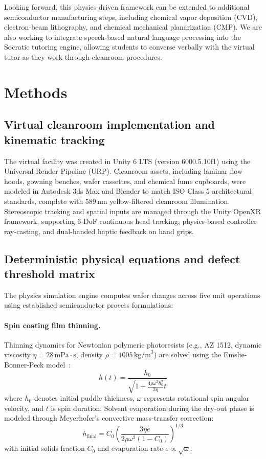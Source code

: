 \documentclass[10pt,a4paper,twocolumn]{article}
\begin{document}
Looking forward, this physics-driven framework can be extended to additional semiconductor manufacturing steps, including chemical vapor deposition (CVD), electron-beam lithography, and chemical mechanical planarization (CMP). We are also working to integrate speech-based natural language processing into the Socratic tutoring engine, allowing students to converse verbally with the virtual tutor as they work through cleanroom procedures.

\section*{Methods}

\subsection*{Virtual cleanroom implementation and kinematic tracking}
The virtual facility was created in Unity 6 LTS (version 6000.5.10f1) using the Universal Render Pipeline (URP). Cleanroom assets, including laminar flow hoods, gowning benches, wafer cassettes, and chemical fume cupboards, were modeled in Autodesk 3ds Max and Blender to match ISO Class 5 architectural standards, complete with $589\,\text{nm}$ yellow-filtered cleanroom illumination. Stereoscopic tracking and spatial inputs are managed through the Unity OpenXR framework, supporting 6-DoF continuous head tracking, physics-based controller ray-casting, and dual-handed haptic feedback on hand grips.

\subsection*{Deterministic physical equations and defect threshold matrix}
The physics simulation engine computes wafer changes across five unit operations using established semiconductor process formulations:

\paragraph{Spin coating film thinning.}
Thinning dynamics for Newtonian polymeric photoresists (e.g., AZ 1512, dynamic viscosity $\eta = 28\,\text{mPa}\cdot\text{s}$, density $\rho = 1005\,\text{kg/m}^3$) are solved using the Emslie-Bonner-Peck model~\cite{emslie1958flow}:
\begin{equation}
h(t) = \frac{h_0}{\sqrt{1 + \frac{4 \rho \omega^2 h_0^2}{3 \eta} t}}
\label{eq:ebp}
\end{equation}
where $h_0$ denotes initial puddle thickness, $\omega$ represents rotational spin angular velocity, and $t$ is spin duration. Solvent evaporation during the dry-out phase is modeled through Meyerhofer's convective mass-transfer correction:
\begin{equation}
h_{\text{final}} = C_0 \left( \frac{3 \eta e}{2 \rho \omega^2 (1 - C_0)} \right)^{1/3}
\label{eq:meyerhofer}
\end{equation}
with initial solids fraction $C_0$ and evaporation rate $e \propto \sqrt{\omega}$.
\end{document}
